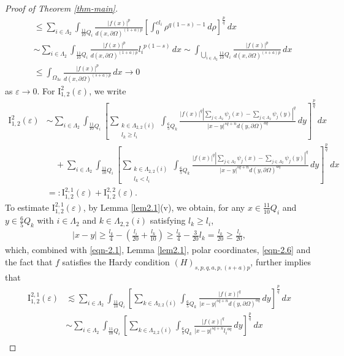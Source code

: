 \documentclass[11pt,twoside]{article}
\def\Qi{\frac{11}{10}Q_i}
\def\Qkk{\frac{6}{5}Q_k}
\def\boz{{\Omega}}
\def\vez{\varepsilon}
\def\pa{\partial}                %
\def\huae{\varepsilon}
\def\bozthreee{\boz_{3\huae}}
\theoremstyle{mylem}
\theoremstyle{definition}
\numberwithin{equation}{section}
\begin{document}
\begin{proof}[Proof of Theorem \ref{thm-main}]
\begin{align}
&\leq \sum_{i \in \Lambda_2} \int_{\Qi} \frac{ |f(x)|^p}{{d(x,\pa\boz)}^{(1+a)p}} \left[ \int_0^{cl_i} \rho^{q(1 - s) - 1}\,d\rho \right]^{\frac{p}{q}}\,dx \nonumber \\
&\sim \sum_{i \in \Lambda_2} \int_{\Qi} \frac{ |f(x)|^p}{{d(x,\pa\boz)}^{(1+a)p}}  {l_i}^{p(1-s)}\,dx \sim \int_{\bigcup_{i \in \Lambda_2} \Qi} \frac{| f(x)|^p}{d(x, \partial\Omega)^{(s+a) p}}\,dx \nonumber \\
&\leq\int_{\bozthreee}\frac{ |f(x)|^p}{d(x, \partial\Omega)^{(s+a)p}}\, dx  \to 0
\end{align}
as $\varepsilon \to 0$. For \( \mathrm{I}_{1,2}^2(\vez) \), we write
\begin{align*}
\mathrm{I}_{1,2}^2(\vez)
&\sim \sum_{i \in \Lambda_2} \int_{\Qi} \left[ \sum_{\substack{k\in\Lambda_{2,2}(i) \\ l_k\geq l_i}}\int_{\Qkk} \frac{| f(x)|^q |\sum_{j \in \Lambda_2} \psi_j(x) - \sum_{j \in \Lambda_2} \psi_j(y)|^q}{|x - y|^{s q + n}d(y,\pa\boz)^{aq}}\,dy \right]^{\frac{p}{q}}\,dx \nonumber \\
&\quad+\sum_{i \in \Lambda_2} \int_{\Qi} \left[ \sum_{\substack{k\in\Lambda_{2,2}(i) \\ l_k< l_i}}\int_{\Qkk} \frac{| f(x)|^q |\sum_{j \in \Lambda_2} \psi_j(x) - \sum_{j \in \Lambda_2} \psi_j(y)|^q}{|x - y|^{s q + n}d(y,\pa\boz)^{aq}}\,dy \right]^{\frac{p}{q}}\,dx \nonumber \\
&=:\mathrm{I}_{1,2}^{2,1}(\vez)+\mathrm{I}_{1,2}^{2,2}(\vez).
\end{align*} 
To estimate $\mathrm{I}_{1,2}^{2,1}(\vez)$, by Lemma \ref{lem2.1}(v), we obtain, for any $x\in\Qi$ and $y\in\Qkk$ with $i\in\Lambda_2$ and $k\in\Lambda_{2,2}(i)$ satisfying $l_k\geq l_i$,
\begin{align}\label{eqn-8.13}
|x-y|\geq\frac{l_k}{4}-\left(\frac{l_i}{20}+\frac{l_k}{10}\right)\geq\frac{l_k}{4}-\frac{3}{20}l_k=\frac{l_k}{20}\geq\frac{l_i}{20},
\end{align}
which, combined with \eqref{eqn-2.1}, Lemma \ref{lem2.1}, polar coordinates, \eqref{eqn-2.6} and the fact that $f$ satisfies the Hardy condition $(H)_{s,p,q,a,p,(s+a)p}$, further implies that
\begin{align}\label{eqn-4.11}
\mathrm{I}_{1,2}^{2,1}(\vez)&\lesssim \sum_{i \in \Lambda_2} \int_{\Qi} \left[ \sum_{k \in \Lambda_{2,2}(i)} \int_{\Qkk} \frac{| f(x)|^q }{|x - y|^{s q + n}d(y,\pa\boz)^{aq}}\,dy \right]^{\frac{p}{q}}\,dx \nonumber \\
&\sim \sum_{i \in \Lambda_2} \int_{\Qi} \left[ \sum_{k \in \Lambda_{2,2}(i)} \int_{\Qkk} \frac{| f(x)|^q }{|x - y|^{s q + n}{l_i}^{aq}}\,dy \right]^{\frac{p}{q}}\,dx \nonumber \\

\end{align}
\end{proof}
\end{document}

